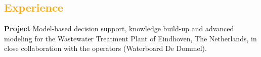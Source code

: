 \documentclass[11pt,a4paper,sans]{moderncv}
\title{}
\begin{document}
\makecvtitle


\colorbox{orange!10}{
	\begin{minipage}{\textwidth}
		\section{\textcolor{orange}{\textbf{Experience}}}
		{\textbf{Project}
			\small Model-based decision support, knowledge build-up and advanced modeling for the Wastewater Treatment Plant of Eindhoven, The Netherlands, in close collaboration with the operators (Waterboard De Dommel).}
		\vspace{0.5cm}
		

\end{minipage}}
\end{document}
